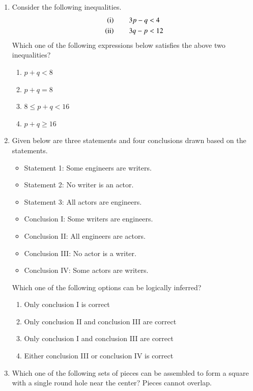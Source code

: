 \documentclass[journal,12pt,onecolumn]{IEEEtran}
\theoremstyle{remark}
\begin{document}
\begin{enumerate}
\item Consider the following inequalities.
\begin{align*}
\left(\text{i}\right) \qquad 3p-q&<4\\
\left(\text{ii}\right)\qquad 3q-p&<12
\end{align*}
Which one of the following expressions below satisfies the above two inequalities?

\hfill{}
\begin{enumerate}
\item $p+q<8$
\item $p+q=8$
\item $8\le p+q<16$
\item $p+q\ge16$
\end{enumerate}

\item Given below are three statements and four conclusions drawn based on the statements.
\begin{itemize}
\item Statement 1: Some engineers are writers.
\item Statement 2: No writer is an actor.
\item Statement 3: All actors are engineers.
\end{itemize}
\begin{itemize}
\item Conclusion I: Some writers are engineers.
\item Conclusion II: All engineers are actors.
\item Conclusion III: No actor is a writer.
\item Conclusion IV: Some actors are writers.
\end{itemize}
Which one of the following options can be logically inferred?

\hfill{}
\begin{enumerate}
\item Only conclusion I is correct
\item Only conclusion II and conclusion III are correct
\item Only conclusion I and conclusion III are correct
\item Either conclusion III or conclusion IV is correct
\end{enumerate}

\item Which one of the following sets of pieces can be assembled to form a square with a single round hole near the center? Pieces cannot overlap.


\end{enumerate}
\end{document}

